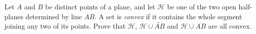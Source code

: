 Let $A$ and $B$ be distinct points of a plane, and let $\mathcal H$ be one of the two open half-planes determined by line $AB$. A set is \emph{convex} if it contains the whole segment joining any two of its points. Prove that $\mathcal H$, $\mathcal H\cup\overleftrightarrow{AB}$ and $\mathcal H\cup\overline{AB}$ are all convex.

